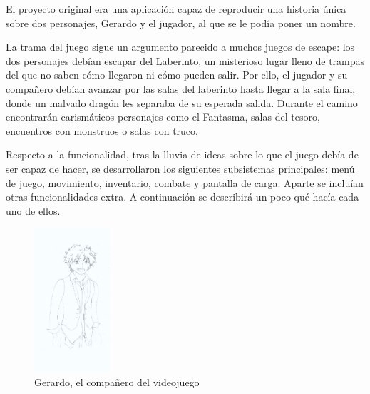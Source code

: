 \documentclass[12pt]{article}
\begin{document}
El proyecto original era una aplicación capaz de reproducir una historia única sobre dos personajes, Gerardo y el jugador, al que se le podía poner un nombre.

La trama del juego sigue un argumento parecido a muchos juegos de escape: los dos personajes debían escapar del Laberinto, un misterioso lugar lleno de trampas del que no saben cómo llegaron ni cómo pueden salir. Por ello, el jugador y su compañero debían avanzar por las salas del laberinto hasta llegar a la sala final, donde un malvado dragón les separaba de su esperada salida. Durante el camino encontrarán carismáticos personajes como el Fantasma, salas del tesoro, encuentros con monstruos o salas con truco.

Respecto a la funcionalidad, tras la lluvia de ideas sobre lo que el juego debía de ser capaz de hacer, se desarrollaron los siguientes subsistemas principales: menú de juego, movimiento, inventario, combate y pantalla de carga. Aparte se incluían otras funcionalidades extra.
A continuación se describirá un poco qué hacía cada uno de ellos.

\begin{figure}[h]
	\caption{Gerardo, el compañero del videojuego}
	\centering
	\includegraphics[width=0.25\textwidth]{GerardoPres.png}
\end{figure}
\end{document}
